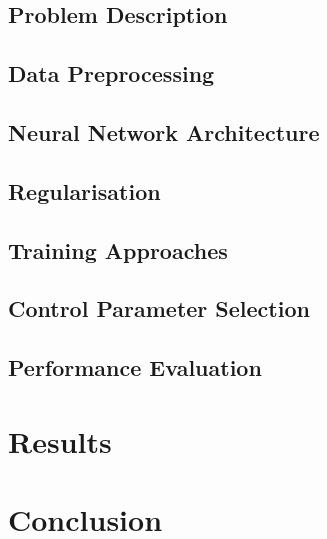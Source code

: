 \documentclass[conference]{IEEEtran}
\begin{document}

\subsection{Problem Description}



\subsection{Data Preprocessing}



\subsection{Neural Network Architecture}



\subsection{Regularisation}



\subsection{Training Approaches}



\subsection{Control Parameter Selection}



\subsection{Performance Evaluation}



\section{Results}
\label{sec:results}




\section{Conclusion}
\label{sec:conclusion}






\end{document}
